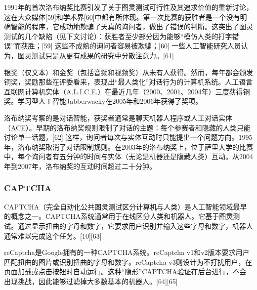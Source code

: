 1991年的首次洛布纳奖比赛引发了关于图灵测试可行性及其追求价值的重新讨论，这在大众媒体[59]和学术界[60]中都有所体现。第一次比赛的获胜者是一个没有明确智能的程序，它成功地欺骗了天真的询问者，做出了错误的判断。这突出了图灵测试的几个缺陷（见下文讨论）：获胜者至少部分因为能够“模仿人类的打字错误”而获胜；[59] 这些不成熟的询问者容易被欺骗；[60] 一些人工智能研究人员认为，图灵测试只是从更有成果的研究中分散注意力。[61]

银奖（仅文本）和金奖（包括音频和视频奖）从未有人获得。然而，每年都会颁发铜奖，奖励那些在评委看来，表现出“最人类化”对话行为的计算机系统。人工语言互联网计算机实体（A.L.I.C.E.）在最近几年（2000、2001、2004年）三度获得铜奖。学习型人工智能Jabberwacky在2005年和2006年获得了奖项。

洛布纳奖考察的是对话智能，获奖者通常是聊天机器人程序或人工对话实体（ACE）。早期的洛布纳奖规则限制了对话的主题：每个参赛者和隐藏的人类只能讨论单一话题，[62] 这样，询问者每次与实体互动时只能提出一个问题方向。1995年，洛布纳奖取消了对话限制规则。在2003年的洛布纳奖上，位于萨里大学的比赛中，每个询问者有五分钟的时间与实体（无论是机器还是隐藏人类）互动。从2004年到2007年，洛布纳奖的互动时间超过二十分钟。
\subsubsection{CAPTCHA} 
CAPTCHA（完全自动化公共图灵测试区分计算机与人类）是人工智能领域最早的概念之一。CAPTCHA系统通常用于在线区分人类和机器人。它基于图灵测试。通过显示扭曲的字母和数字，它要求用户识别并输入这些字母和数字，机器人通常难以完成这个任务。[10][63]

reCaptcha是Google拥有的一种CAPTCHA系统。reCaptcha v1和v2版本要求用户匹配扭曲的图片或识别扭曲的字母和数字。reCaptcha v3则设计为不打扰用户，在页面加载或点击按钮时自动运行。这种“隐形”CAPTCHA验证在后台进行，不会出现挑战，因此能够过滤掉大多数基本的机器人。[64][65]